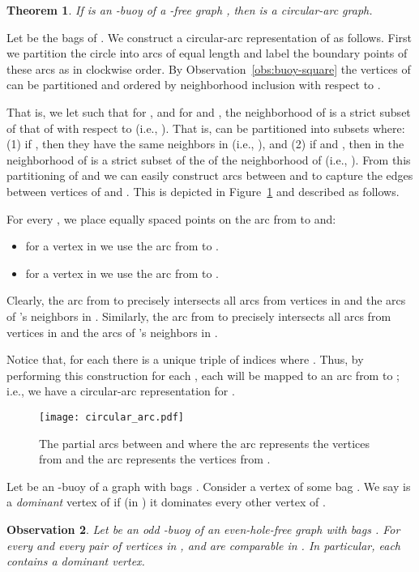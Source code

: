 \documentclass[11pt,a4paper]{article}
\newtheorem{theorem} {Theorem}[section]
\newtheorem{observation}[theorem]{Observation}
\newenvironment{proof}{\noindent {\it Proof:~}}{\hfill \smallskip\par}
\begin{document}
\begin{theorem}\label{thm:buoy-square-circarc}
If  is an -buoy of a -free graph , then  is a
circular-arc graph.
\end{theorem}
\begin{proof}
Let  be the bags of . We construct a
circular-arc representation of  as follows. First we partition
the circle into  arcs of equal length and label the boundary
points of these arcs as  in clockwise
order. By Observation~\ref{obs:buoy-square} the vertices of 
can be partitioned and ordered by neighborhood inclusion with
respect to .

That is, we let  such that for
,  and
for  and , the neighborhood of 
is a strict subset of that of  with respect to  (i.e.,
  ).
That is,  can be partitioned into  subsets  where: (1) if , then they
have the same neighbors in  (i.e., ), and (2) if  and , then  in  the neighborhood of  is a strict
subset of the of the neighborhood of   (i.e., ).
From this partitioning of  and  we can easily
construct arcs between  and  to capture the edges
between vertices of  and . This is depicted in
Figure~\ref{fig:circular_arc} and described as follows.

For every , we place  equally spaced points  on the arc from  to  and:
\begin{itemize}
\item for a vertex  in  we use the arc from 
to .
\item for a vertex  in  we use the arc from
 to .
\end{itemize}
Clearly, the arc from  to  precisely intersects all
arcs from vertices in  and the arcs of 's neighbors in
. Similarly, the arc from  to  precisely
intersects all arcs from vertices in  and the arcs of
's neighbors in .

Notice that, for each  there is a unique triple
 of indices where . Thus,
by performing this construction for each , each  will be mapped to an arc from
 to ; i.e., we have a circular-arc representation
for .
\end{proof}
\begin{figure}[h]
\centering
\texttt{[image: circular\_arc.pdf]}
\caption{The partial arcs between  and  where the
arc  represents the vertices from  and the arc
 represents the vertices from .}
\label{fig:circular_arc}
\end{figure}
Let  be an -buoy of a graph  with bags . Consider a vertex  of some bag . We say 
is  a {\it dominant} vertex of  if (in ) it dominates
every other vertex of .
\begin{observation}\label{obs:buoy-comparable}
Let  be an odd -buoy of an even-hole-free graph  with bags
. For every    and every pair of vertices  in
,  and  are comparable in . In particular, each
 contains a dominant vertex.
\end{observation}
\end{document}

